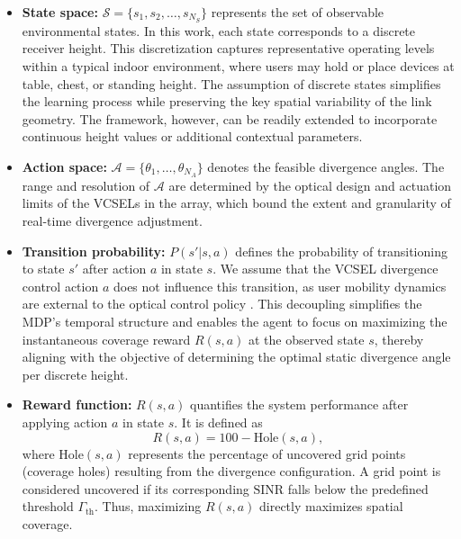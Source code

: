 \documentclass[twocolumn,twoside]{IEEEtran}
\theoremstyle{break}
\begin{document}
\begin{itemize}
		\item \textbf{State space:} $\mathcal{S} = \{s_1, s_2, \dots, s_{N_S}\}$ represents the set of observable environmental states. In this work, each state corresponds to a discrete receiver height. This discretization captures representative operating levels within a typical indoor environment, where users may hold or place devices at table, chest, or standing height. The assumption of discrete states simplifies the learning process while preserving the key spatial variability of the link geometry. The framework, however, can be readily extended to incorporate continuous height values or additional contextual parameters.

	
	
	
	
	
	\item \textbf{Action space:} $\mathcal{A}=\{\theta_1,\dots,\theta_{N_A}\}$ denotes the feasible divergence angles. The range and resolution of $\mathcal{A}$ are determined by the optical design and actuation limits of the VCSELs in the array, which bound the extent and granularity of real-time divergence adjustment.
	
	
	\item \textbf{Transition probability:} $P(s'|s,a)$ defines the probability of transitioning to state $s'$ after action $a$ in state $s$. 
	We assume that the VCSEL divergence control action $a$ does not influence this transition, as user mobility dynamics are external to the optical control policy \cite{Q-learning}. This decoupling simplifies the MDP’s temporal structure and enables the agent to focus on maximizing the instantaneous coverage reward $R(s,a)$ at the observed state $s$, thereby aligning with the objective of determining the optimal static divergence angle per discrete height.
	
	

	\item \textbf{Reward function:} $R(s, a)$ quantifies the system performance after applying action $a$ in state $s$. It is defined as
	\begin{equation}
		R(s, a) = 100 - \text{Hole}(s, a),
	\end{equation}
	where $\text{Hole}(s, a)$ represents the percentage of uncovered grid points (coverage holes) resulting from the divergence configuration. A grid point is considered uncovered if its corresponding $\text{SINR}$ falls below the predefined threshold $\Gamma_{\text{th}}$. Thus, maximizing $R(s, a)$  directly maximizes spatial coverage.
	


\end{itemize}
\end{document}
